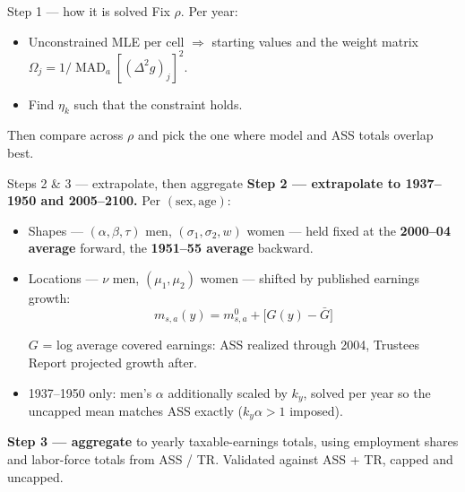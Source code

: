 \documentclass[10pt,aspectratio=169]{beamer}
\begin{document}
\begin{frame}{Step 1 --- how it is solved}
  Fix $\rho$. Per year:
  \begin{itemize}
    \item[\textbf{0.}] Unconstrained MLE per cell $\Rightarrow$ starting values and the weight
      matrix $\Omega_j=1/\operatorname{MAD}_a[(\Delta^2 g)_j]^2$.
    \item[\textbf{1.}] Find $\eta_k$ such that the constraint holds.
  \end{itemize}
  \vfill
  Then compare across $\rho$ and pick the one where model and ASS totals overlap best.
\end{frame}

\begin{frame}{Steps 2 \& 3 --- extrapolate, then aggregate}
  \small
  \textbf{Step 2 --- extrapolate to 1937--1950 and 2005--2100.} Per $(\text{sex},\text{age})$:
  \begin{itemize}\itemsep1pt
    \item Shapes --- $(\alpha,\beta,\tau)$ men, $(\sigma_1,\sigma_2,w)$ women --- held fixed at
      the \textbf{2000--04 average} forward, the \textbf{1951--55 average} backward.
    \item Locations --- $\nu$ men, $(\mu_1,\mu_2)$ women --- shifted by published earnings growth:
      \vspace{-3pt}
      \[
        m_{s,a}(y)=m_{s,a}^{0}+\bigl[G(y)-\bar G\bigr]
      \]
      \vspace{-13pt}

      {\footnotesize $G$ = log average covered earnings: ASS realized through 2004, Trustees
      Report projected growth after.\par}
    \item 1937--1950 only: men's $\alpha$ additionally scaled by $k_y$, solved per year so the
      uncapped mean matches ASS exactly ($k_y\alpha>1$ imposed).
  \end{itemize}

  \smallskip
  \textbf{Step 3 --- aggregate} to yearly taxable-earnings totals, using employment shares and
  labor-force totals from ASS / TR. Validated against ASS + TR, capped and uncapped.
\end{frame}
\end{document}
